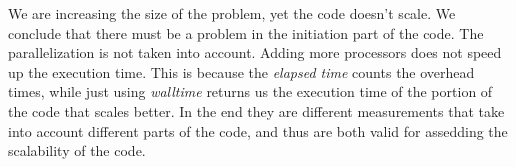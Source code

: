 \documentclass[11pt]{scrartcl} %
\begin{document}
We are increasing the size of the problem, yet the code doesn't scale. We conclude that there must be a problem in the initiation part of the code. The parallelization is not taken into account. Adding more processors does not speed up the execution time.
This is because the \textit{elapsed time} counts the overhead times, while just using \textit{walltime} returns us the execution time of the portion of the code that scales better. In the end they are different measurements that take into account different parts of the code, and thus are both valid for assedding the scalability of the code.








\end{document}
